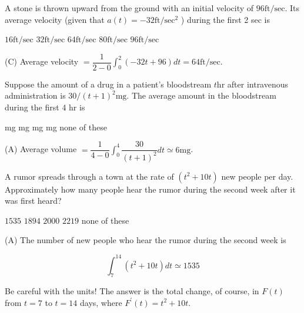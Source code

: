 \question
A stone is thrown upward from the ground with an initial velocity of $96 \mathrm{ft} / \mathrm{sec}$. Its average velocity (given that $a(t)=-32 \mathrm{ft} / \mathrm{sec}^{2}$ ) during the first 2 sec is
\begin{choices}
  \choice $16 \mathrm{ft} / \mathrm{sec}$
  \choice $32 \mathrm{ft} / \mathrm{sec}$
  \CorrectChoice $64 \mathrm{ft} / \mathrm{sec}$
  \choice $80 \mathrm{ft} / \mathrm{sec}$
  \choice $96 \mathrm{ft} / \mathrm{sec}$
\end{choices}
\begin{solution}
(C) Average velocity $=\dfrac{1}{2-0} \int_{0}^{2}(-32 t+96) d t=64 \mathrm{ft} / \mathrm{sec}$.
\end{solution}

\question
Suppose the amount of a drug in a patient's bloodstream $t \mathrm{hr}$ after intravenous administration is $30 /(t+1)^{2} \mathrm{mg}$. The average amount in the bloodstream during the first 4 hr is
\begin{choices}
   mg
   mg
   mg
   mg
  \choice none of these
\end{choices}
\begin{solution}
(A) Average volume $=\dfrac{1}{4-0} \int_{0}^{4} \dfrac{30}{(t+1)^{2}} d t \simeq 6 \mathrm{mg}$.
\end{solution}



\newpage



\question
A rumor spreads through a town at the rate of $\left(t^{2}+10 t\right)$ new people per day. Approximately how many people hear the rumor during the second week after it was first heard?
\begin{choices}
  \CorrectChoice $1535$
  \choice $1894$
  \choice $2000$
  \choice $2219$
  \choice none of these
\end{choices}
\begin{solution}
(A) The number of new people who hear the rumor during the second week is

\[
\int_{7}^{14}\left(t^{2}+10 t\right) d t \simeq 1535
\]

Be careful with the units! The answer is the total change, of course, in $F(t)$ from $t=7$ to $t=14$ days, where $F^{\prime}(t)=t^{2}+10 t$.
\end{solution}

